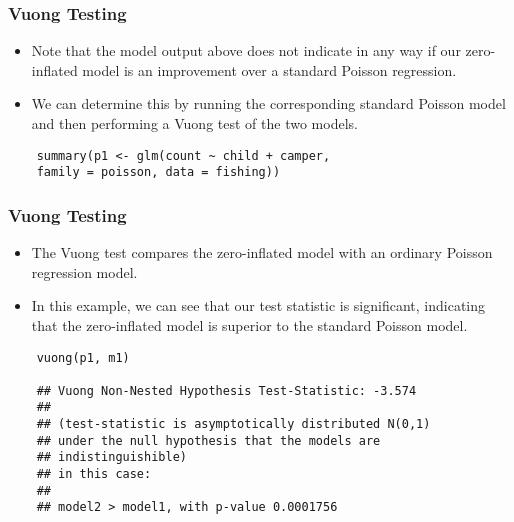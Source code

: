 \documentclass[MASTER.tex]{subfiles}
\begin{document}
\begin{frame}[fragile]
\frametitle{Vuong Testing}
	\begin{itemize}
		\item Note that the model output above does not indicate in any way if our zero-inflated model is an improvement over a standard Poisson regression. 
		\item We can determine this by running the corresponding standard Poisson model and then performing a Vuong test of the two models.
	\end{itemize}
	\begin{verbatim}
	summary(p1 <- glm(count ~ child + camper, 
	family = poisson, data = fishing))
	\end{verbatim}
\end{frame}
\begin{frame}[fragile]
	\frametitle{Vuong Testing}
	\large
	\begin{itemize}
		\item The Vuong test compares the zero-inflated model with an ordinary Poisson regression model. 
		\item In this example, we can see that our test statistic is significant, indicating that the zero-inflated model is superior to the standard Poisson model.
	\end{itemize}
\end{frame}
\begin{frame}[fragile]

	\begin{verbatim}
	vuong(p1, m1)
	
	## Vuong Non-Nested Hypothesis Test-Statistic: -3.574 
	##
	## (test-statistic is asymptotically distributed N(0,1) 
	## under the null hypothesis that the models are 
	## indistinguishible)
	## in this case:
	##
	## model2 > model1, with p-value 0.0001756
	\end{verbatim}
\end{frame}
\end{document}
